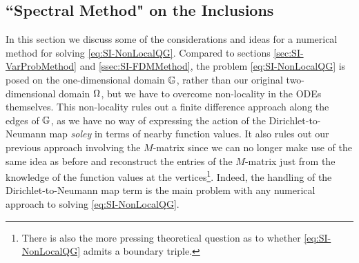 \subsection{``Spectral Method" on the Inclusions} \label{ssec:SI-GraphMethod}
In this section we discuss some of the considerations and ideas for a numerical method for solving \eqref{eq:SI-NonLocalQG}.
Compared to sections \ref{sec:SI-VarProbMethod} and \ref{ssec:SI-FDMMethod}, the problem \eqref{eq:SI-NonLocalQG} is posed on the one-dimensional domain $\mathbb{G}$, rather than our original two-dimensional domain $\Omega$, but we have to overcome non-locality in the ODEs themselves.
This non-locality rules out a finite difference approach along the edges of $\mathbb{G}$, as we have no way of expressing the action of the Dirichlet-to-Neumann map \emph{soley} in terms of nearby function values.
It also rules out our previous approach involving the $M$-matrix since we can no longer make use of the same idea as before and reconstruct the entries of the $M$-matrix just from the knowledge of the function values at the vertices\footnote{There is also the more pressing theoretical question as to whether \eqref{eq:SI-NonLocalQG} admits a boundary triple.}.
Indeed, the handling of the Dirichlet-to-Neumann map term is the main problem with any numerical approach to solving \eqref{eq:SI-NonLocalQG}.

